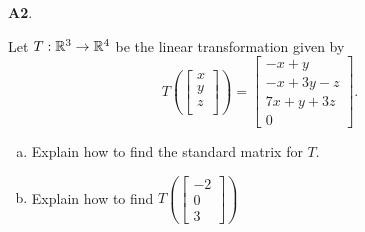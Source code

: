 \documentclass{article}
\newenvironment{problem}[1]
{
  \begin{flushleft}
  \textbf{#1}.
  \ignorespaces
}
{
  \end{flushleft}
}
\begin{document}
\begin{problem}{A2}
Let $T: \mathbb{R}^3\rightarrow \mathbb{R}^4$ be the linear transformation given by $$T\left(\begin{bmatrix} x \\ y \\ z \\  \end{bmatrix} \right) = \begin{bmatrix} -x+y \\ -x+3y-z \\ 7x+y+3z \\ 0 \end{bmatrix}.$$
\begin{enumerate}[(a)]
\item Explain how to find the standard matrix for \(T\).
\item Explain how to find \( T\left( \begin{bmatrix} -2 \\ 0 \\ 3 \end{bmatrix} \right) \)
\end{enumerate}
\end{problem}
\end{document}
